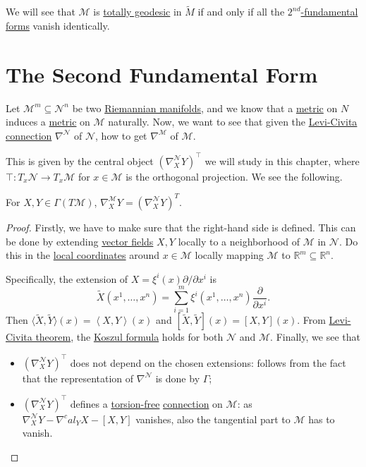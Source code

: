 \begin{note}
	We will see that \(\mathcal{M} \) is \hyperref[def:totally-geodesic]{totally geodesic} in \(\widetilde{M} \) if and only if all the \hyperref[def:2nd-fundamental-form]{\(2^{nd}\)-fundamental forms} vanish identically.
\end{note}

\section{The Second Fundamental Form}
Let \(\mathcal{M} ^m \subseteq \mathcal{N} ^n\) be two \hyperref[def:Riemannian-manifold]{Riemannian manifolds}, and we know that a \hyperref[def:Riemannian-metric]{metric} on \(N\) induces a \hyperref[def:Riemannian-metric]{metric} on \(\mathcal{M} \) naturally. Now, we want to see that given the \hyperref[def:Levi-Civita-connection]{Levi-Civita connection} \(\nabla ^\mathcal{N} \) of \(\mathcal{N} \), how to get \(\nabla ^\mathcal{M} \) of \(\mathcal{M} \).

This is given by the central object \((\nabla ^\mathcal{N} _X Y)^{\top}\) we will study in this chapter, where \(\top \colon T_x \mathcal{N} \to T_x \mathcal{M} \) for \(x\in \mathcal{M} \) is the orthogonal projection. We see the following.

\begin{theorem}\label{thm:lec14}
	For \(X, Y\in \Gamma (T \mathcal{M} )\), \(\nabla ^\mathcal{M} _X Y = \left( \nabla ^\mathcal{N} _X Y \right)^{T}\).
\end{theorem}
\begin{proof}
	Firstly, we have to make sure that the right-hand side is defined. This can be done by extending \hyperref[def:vector-field]{vector fields} \(X, Y\) locally to a neighborhood of \(\mathcal{M} \) in \(\mathcal{N} \). Do this in the \hyperref[def:local-coordinate]{local coordinates} around \(x\in \mathcal{M} \) locally mapping \(\mathcal{M} \) to \(\mathbb{R} ^m \subseteq \mathbb{R} ^n\).

	Specifically, the extension of \(X = \xi ^i(x) \partial / \partial x^i\) is
	\[
		\widetilde{X} (x^1, \dots , x^n) = \sum_{i=1}^{m} \xi ^i(x^1, \dots , x^n) \frac{\partial }{\partial x^i}.
	\]
	Then \(\langle \widetilde{X} , \widetilde{Y} \rangle (x) = \left\langle X, Y \right\rangle (x)\) and \([\widetilde{X} , \widetilde{Y} ](x) = [X, Y](x)\). From \hyperref[thm:Levi-Civita]{Levi-Civita theorem}, the \hyperref[eq:Koszul-formula]{Koszul formula} holds for both \(\mathcal{N} \) and \(\mathcal{M} \). Finally, we see that
	\begin{itemize}
		\item \((\nabla _X^{\mathcal{N}} Y)^{\top}\) does not depend on the chosen extensions: follows from the fact that the representation of \(\nabla ^\mathcal{N} \) is done by \(\Gamma \);
		\item \((\nabla _X^{\mathcal{N}} Y)^{\top}\) defines a \hyperref[def:torsion-free]{torsion-free} \hyperref[def:linear-connection]{connection} on \(\mathcal{M} \): as \(\nabla ^\mathcal{N} _X Y - \nabla ^cal_Y X - [X, Y]\) vanishes, also the tangential part to \(\mathcal{M} \) has to vanish.
	\end{itemize}
\end{proof}

